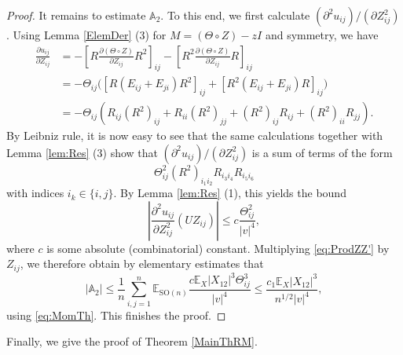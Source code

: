 \documentclass[a4paper,12pt]{amsart}
\numberwithin{equation}{section}
\theoremstyle{remark}
\def\E{{\mathbb E}}
\begin{document}
\begin{proof}
It remains to estimate $\mathbb A_2$. To this end, we first calculate $(\partial^2 u_{i j})/(\partial Z_{i j}^2)$. Using Lemma \ref{ElemDer} (3) for $M=(\Theta \circ Z)-zI$ and symmetry, we have
\begin{align*}
\frac{\partial u_{ij}}{\partial Z_{ij}} &= - \left [ R \frac{\partial (\Theta \circ Z) }{\partial Z_{ij}} R^2 \right ]_{ij} - \left [R^2 \frac{\partial (\Theta \circ Z) }{\partial Z_{ij}} R \right ]_{ij}\\
&=-\Theta_{ij}\Big( [R(E_{ij} + E_{ji})R^2]_{ij} + [R^2(E_{ij} + E_{ji})R]_{ij}\Big)\\
&=-\Theta_{ij}(R_{ij}(R^2)_{ij} + R_{ii}(R^2)_{jj} + (R^2)_{ij}R_{ij} + (R^2)_{ii}R_{jj}).
\end{align*}
By Leibniz rule, it is now easy to see that the same calculations together with Lemma \ref{lem:Res} (3) show that $(\partial^2 u_{i j})/(\partial Z_{i j}^2)$ is a sum of terms of the form
\[
\Theta_{ij}^2 (R^2)_{i_1i_2}R_{i_3i_4}R_{i_5i_6}
\]
with indices $i_k \in \{i,j\}$. By Lemma \ref{lem:Res} (1), this yields the bound
\[
\left|\frac{\partial^2 u_{ij}}{\partial Z_{ij}^2}(UZ_{ij}) \right| \le c \frac{\Theta_{ij}^2}{|v|^4},
\]
where $c$ is some absolute (combinatorial) constant. Multiplying \eqref{eq:ProdZZ'} by $Z_{ij}$, we therefore obtain by elementary estimates that
\begin{equation*}
|\mathbb A_2| \le   \frac 1 n \sum_{i,j=1}^n \E_{\mathrm{SO}(n)} \frac{ c \E_X  |X_{12}|^3  \Theta_{ij}^3}{|v|^4} \le \frac{c_1 \E_X  |X_{12}|^3} {n^{1/2} |v|^4},
\end{equation*}
using \eqref{eq:MomTh}. This finishes the proof.
\end{proof}

Finally, we give the proof of Theorem \ref{MainThRM}.
\end{document}

